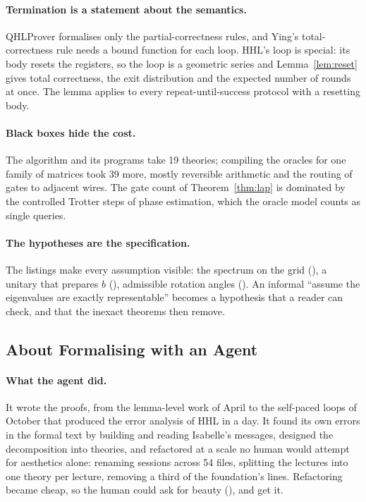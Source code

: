 \paragraph{Termination is a statement about the semantics.} QHLProver formalises only the
partial-correctness rules, and Ying's total-correctness rule needs a bound function for each loop. HHL's loop is special: its body resets the registers, so the loop
is a geometric series and Lemma~\ref{lem:reset} gives total correctness, the exit distribution and the
expected number of rounds at once. The lemma applies to every repeat-until-success protocol with a
resetting body.

\paragraph{Black boxes hide the cost.} The algorithm and its programs take 19 theories; compiling the
oracles for one family of matrices took 39 more, mostly reversible arithmetic and the routing of gates
to adjacent wires. The gate count of Theorem~\ref{thm:lap} is dominated by the controlled Trotter steps
of phase estimation, which the oracle model counts as single queries.

\paragraph{The hypotheses are the specification.} The listings make every assumption visible: the
spectrum on the grid (), a unitary that prepares $b$ (), admissible rotation angles
(). An informal ``assume the eigenvalues are exactly representable'' becomes a hypothesis that a
reader can check, and that the inexact theorems then remove.

\subsection{About Formalising with an Agent}

\paragraph{What the agent did.} It wrote the proofs, from the lemma-level work of April to the
self-paced loops of October that produced the error analysis of HHL in a day. It found its own errors
in the formal text by building and reading Isabelle's messages, designed the decomposition into
theories, and refactored at a scale no human would attempt for aesthetics alone: renaming sessions
across 54 files, splitting the lectures into one theory per lecture, removing a third of the
foundation's lines. Refactoring became cheap, so the human could ask for beauty
(), and get it.

